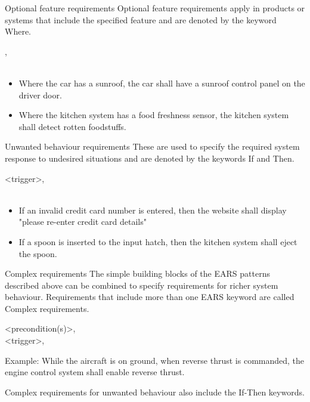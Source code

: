 \documentclass[aspectratio=169]{beamer}
\begin{document}
\begin{slide}{Optional feature requirements}
  Optional feature requirements apply in products or systems that include the specified feature and are denoted by the keyword Where.
    \begin{block}{}
      , \\
        \\
    \end{block}
  
  \begin{example}
  \begin{itemize}
    \item Where the car has a sunroof, the car shall have a sunroof control panel on the driver door.
    \item Where the kitchen system has a food freshness sensor, the kitchen system shall detect rotten foodstuffs. 
  \end{itemize}
  \end{example}
\end{slide}



\begin{slide}{Unwanted behaviour requirements}
    These are used to specify the required system response to undesired situations and are denoted by the keywords If and Then.
    \begin{block}{}
     \eif <trigger>, \ethen\\
      \\
    \end{block}
      
  \begin{example}
  \begin{itemize}
    \item If an invalid credit card number is entered, then the website shall display "please re-enter credit card details"
    \item  If a spoon is inserted to the input hatch, then the kitchen system shall eject the spoon.
  \end{itemize}
  \end{example}
\end{slide}



\begin{slide}{Complex requirements}
  The simple building blocks of the EARS patterns described above can be combined to specify requirements for richer system behaviour. Requirements that include more than one EARS keyword are called Complex requirements.
    \begin{block}{}
     \ewhile <precondition(s)>, \\
      \ewhen <trigger>, \\
        
    \end{block}
    Example: While the aircraft is on ground, when reverse thrust is commanded, the engine control system shall enable reverse thrust.

Complex requirements for unwanted behaviour also include the If-Then keywords.
\end{slide}
\end{document}

